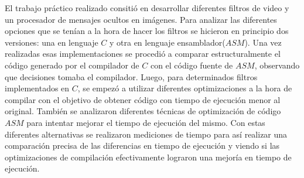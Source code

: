 El trabajo pr\'actico realizado consiti\'o en desarrollar diferentes filtros de video y un procesador de mensajes ocultos en im\'agenes. Para analizar las diferentes opciones que se ten\'ian a la hora de hacer los filtros se hicieron en principio dos versiones: una en lenguaje $C$ y otra en lenguaje ensamblador($ASM$). Una vez realizadas esas implementaciones se procedi\'o a comparar estructuralmente el c\'odigo generado por el compilador de $C$ con el c\'odigo fuente de $ASM$, observando que decisiones tomaba el compilador. Luego, para determinados filtros implementados en $C$, se empez\'o a utilizar diferentes optimizaciones a la hora de compilar con el objetivo de obtener c\'odigo con tiempo de ejecuci\'on menor al original. Tambi\'en se analizaron diferentes t\'ecnicas de optimizaci\'on de c\'odigo $ASM$ para intentar mejorar el tiempo de ejecuci\'on del mismo. Con estas diferentes alternativas se realizaron mediciones de tiempo para as\'i realizar una comparaci\'on precisa de las diferencias en tiempo de ejecuci\'on y viendo si las optimizaciones de compilaci\'on efectivamente lograron una mejor\'ia en tiempo de ejecuci\'on.


